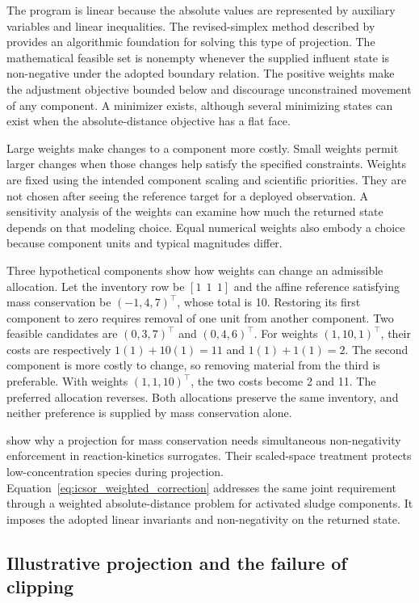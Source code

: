 The program is linear because the absolute values are represented by auxiliary variables and linear inequalities. The revised-simplex method described by \citet{HuangfuHall2018} provides an algorithmic foundation for solving this type of projection. The mathematical feasible set is nonempty whenever the supplied influent state is non-negative under the adopted boundary relation. The positive weights make the adjustment objective bounded below and discourage unconstrained movement of any component. A minimizer exists, although several minimizing states can exist when the absolute-distance objective has a flat face.

Large weights make changes to a component more costly. Small weights permit larger changes when those changes help satisfy the specified constraints. Weights are fixed using the intended component scaling and scientific priorities. They are not chosen after seeing the reference target for a deployed observation. A sensitivity analysis of the weights can examine how much the returned state depends on that modeling choice. Equal numerical weights also embody a choice because component units and typical magnitudes differ.

Three hypothetical components show how weights can change an admissible allocation. Let the inventory row be \([1\ \ 1\ \ 1]\) and the affine reference satisfying mass conservation be \((-1,4,7)^\top\), whose total is 10. Restoring its first component to zero requires removal of one unit from another component. Two feasible candidates are \((0,3,7)^\top\) and \((0,4,6)^\top\). For weights \((1,10,1)^\top\), their costs are respectively \(1(1)+10(1)=11\) and \(1(1)+1(1)=2\). The second component is more costly to change, so removing material from the third is preferable. With weights \((1,1,10)^\top\), the two costs become 2 and 11. The preferred allocation reverses. Both allocations preserve the same inventory, and neither preference is supplied by mass conservation alone.

\citet{KircherVotsmeier2025} show why a projection for mass conservation needs simultaneous non-negativity enforcement in reaction-kinetics surrogates. Their scaled-space treatment protects low-concentration species during projection. Equation~\eqref{eq:icsor_weighted_correction} addresses the same joint requirement through a weighted absolute-distance problem for activated sludge components. It imposes the adopted linear invariants and non-negativity on the returned state.

\subsection{Illustrative projection and the failure of clipping}

